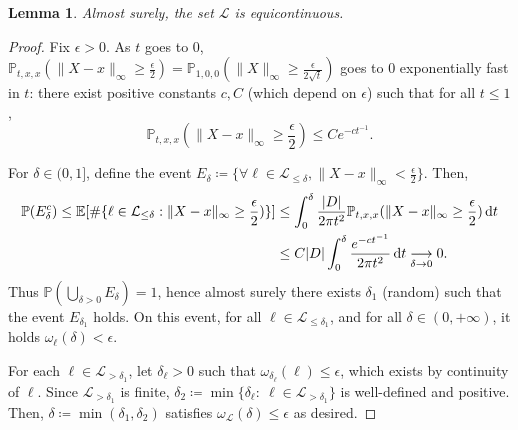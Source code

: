 \documentclass[11pt]{article}
\newtheorem{lemma}[theorem]{Lemma}
\def\d{\,{\rm d}}
\begin{document}
\begin{lemma}
  \label{le:item:unifcont}
  Almost surely, the set $\mathcal{L}$ is equicontinuous.
\end{lemma}
\begin{proof}
  Fix $\epsilon>0$.
  As $t$ goes to $0$, $\mathbb{P}_{t,x,x}( \|X-x\|_\infty\geq  \frac{\epsilon}{2} )=
  \mathbb{P}_{1,0,0}( \|X\|_\infty\geq  \frac{\epsilon}{2 \sqrt{t}})
  $ goes to $0$ exponentially fast in $t$: there exist positive constants $c,C$ (which depend on $\epsilon$) such that for all $t\leq 1$,
  \[\mathbb{P}_{t,x,x}( \|X-x\|_\infty\geq  \frac{\epsilon}{2} ) \leq C e^{- c t^{-1} }.\]

  For $\delta\in (0,1]$, define the event
  $E_\delta\coloneqq \{ \forall \ell \in \mathcal{L}_{\leq \delta } ,   \|X-x\|_\infty<  \frac{\epsilon}{2} \}$.
  Then,
  \begin{align*}
  \mathbb{P}(E_\delta^c )
  \leq
  \mathbb{E}[ \# \{  \ell \in \mathcal{L}_{\leq \delta } : \|X-x\|_\infty\geq  \frac{\epsilon}{2}   ) \}]
&  \leq \int_0^{\delta}  \frac{|D| }{2\pi t^2}  \mathbb{P}_{t,x,x}( \|X-x\|_\infty\geq  \frac{\epsilon}{2} ) \d t\\
&  \leq
  C |D| \int_0^{\delta} \frac{e^{-ct^{-1} }}{2\pi t^2} \d t\underset{\delta\to 0}\longrightarrow 0.
  \end{align*}
  Thus $\mathbb{P}(\bigcup_{\delta>0} E_\delta)=1$, hence almost surely there exists $\delta_1$ (random) such that the event $E_{\delta_1}$ holds. On this event, for all $\ell\in  \mathcal{L}_{\leq \delta_1 } $, and for all $\delta\in(0,+\infty)$, it holds $\omega_\ell(\delta)<\epsilon$.

  For each $\ell\in \mathcal{L}_{> \delta_1}$, let $\delta_\ell>0$ such that
  $\omega_{\delta_\ell}(\ell)\leq \epsilon$, which exists by continuity of $\ell$. Since $\mathcal{L}_{>\delta_1}$ is finite, $\delta_2\coloneqq \min \{\delta_\ell : \ \ell \in \mathcal{L}_{> \delta_1} \}$ is well-defined and positive. Then, $\delta\coloneqq \min(\delta_1, \delta_2)$ satisfies $\omega_\mathcal{L}(\delta)\leq \epsilon$ as desired.
\end{proof}
\end{document}
